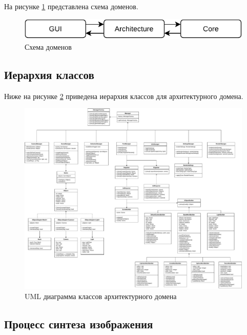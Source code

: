 На рисунке \ref{schema:domen} представлена схема доменов.

\begin{figure}[h]
	\centering
	\includegraphics[width=\linewidth,height=0.85\textheight,keepaspectratio]{diagrams/domens.pdf}
	\caption{Схема доменов}
	\label{schema:domen}
\end{figure}

\subsection{Иерархия классов}

Ниже на рисунке \ref{uml:arch} приведена иерархия классов для архитектурного домена.

\begin{figure}
	\centering
	\includegraphics[angle=90,origin=c,width=\linewidth,height=0.85\textheight,keepaspectratio]{diagrams/uml.pdf}
	\caption{UML диаграмма классов архитектурного домена}
	\label{uml:arch}
\end{figure}

\clearpage

\subsection{Процесс синтеза изображения}

